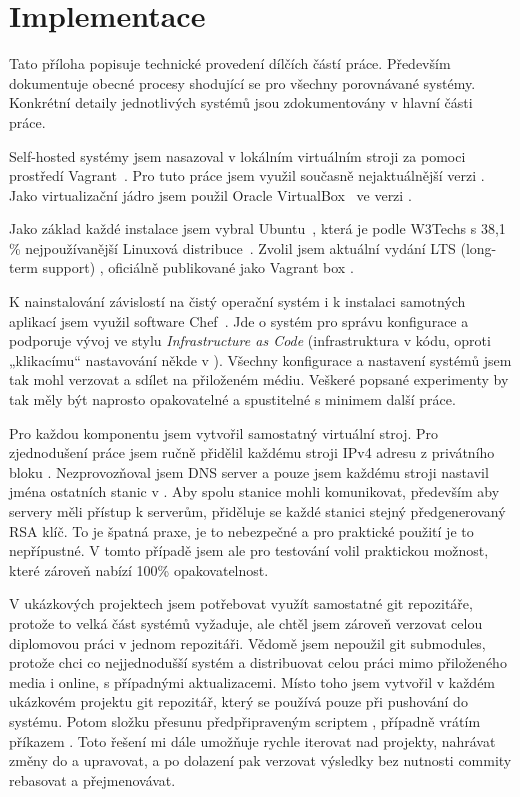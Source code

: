 \chapter{Implementace}\label{ch:implementace}

Tato příloha popisuje technické provedení dílčích částí práce. Především dokumentuje obecné procesy shodující se pro všechny porovnávané \CICD systémy. Konkrétní detaily jednotlivých systémů jsou zdokumentovány v hlavní části práce.

Self-hosted \CICD systémy jsem nasazoval v lokálním virtuálním stroji za pomoci prostředí Vagrant~\cite{hashimoto-vagrant,susanka-vagrant}. Pro tuto práce jsem využil současně nejaktuálnější verzi . Jako virtualizační jádro jsem použil Oracle VirtualBox~\cite{virtualbox} ve verzi .

Jako základ každé instalace jsem vybral Ubuntu~\cite{ubuntu}, která je podle W3Techs s 38,1 \% nejpoužívanější Linuxová distribuce~\cite{w3techs-stats}. Zvolil jsem aktuální vydání LTS (long-term support) , oficiálně publikované jako Vagrant box .

K nainstalování závislostí na čistý operační systém i k instalaci samotných aplikací jsem využil software Chef~\cite{chef}. Jde o systém pro správu konfigurace a podporuje vývoj ve stylu \textit{Infrastructure as Code} (infrastruktura v kódu, oproti „klikacímu“ nastavování někde v ). Všechny konfigurace a nastavení systémů jsem tak mohl verzovat a sdílet na přiloženém médiu. Veškeré popsané experimenty by tak měly být naprosto opakovatelné a spustitelné s minimem další práce.

Pro každou komponentu jsem vytvořil samostatný virtuální stroj. Pro zjednodušení práce jsem ručně přidělil každému stroji IPv4 adresu z privátního bloku . Nezprovozňoval jsem DNS server a pouze jsem každému stroji nastavil jména ostatních stanic v . Aby spolu stanice mohli komunikovat, především aby \CD servery měli přístup k \HTTP serverům, přiděluje se každé stanici stejný předgenerovaný RSA klíč. To je špatná praxe, je to nebezpečné a pro praktické použití je to nepřípustné. V tomto případě jsem ale pro testování volil praktickou možnost, které zároveň nabízí 100\% opakovatelnost.

V ukázkových projektech jsem potřebovat využít samostatné git repozitáře, protože to velká část \CICD systémů vyžaduje, ale chtěl jsem zároveň verzovat celou diplomovou práci v jednom repozitáři. Vědomě jsem nepoužil git submodules, protože chci co nejjednodušší systém a distribuovat celou práci mimo přiloženého media i online, s případnými aktualizacemi. Místo toho jsem vytvořil v každém ukázkovém projektu git repozitář, který se používá pouze při pushování do \CICD systému. Potom složku  přesunu předpřipraveným scriptem , případně vrátím příkazem . Toto řešení mi dále umožňuje rychle iterovat nad projekty, nahrávat změny do \CICD a upravovat, a po dolazení pak verzovat výsledky bez nutnosti commity rebasovat a přejmenovávat.


